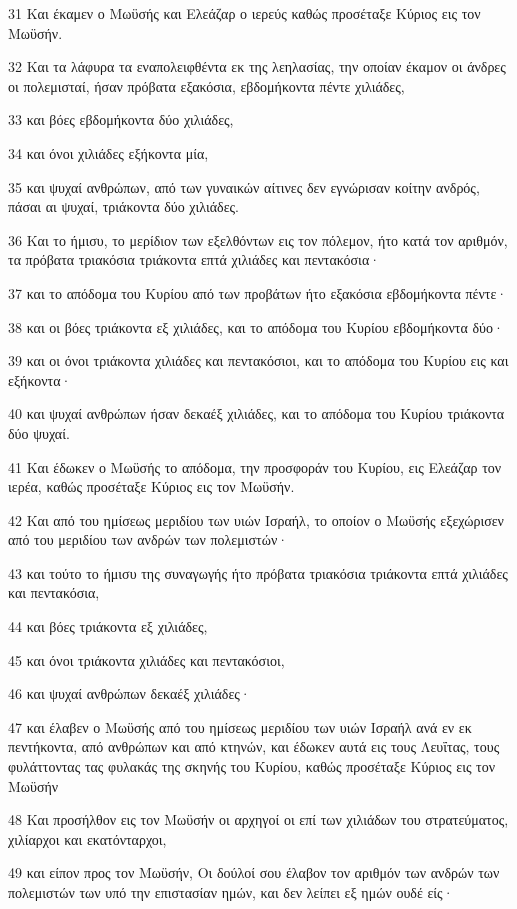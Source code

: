 \par 31 Και έκαμεν ο Μωϋσής και Ελεάζαρ ο ιερεύς καθώς προσέταξε Κύριος εις τον Μωϋσήν.
\par 32 Και τα λάφυρα τα εναπολειφθέντα εκ της λεηλασίας, την οποίαν έκαμον οι άνδρες οι πολεμισταί, ήσαν πρόβατα εξακόσια, εβδομήκοντα πέντε χιλιάδες,
\par 33 και βόες εβδομήκοντα δύο χιλιάδες,
\par 34 και όνοι χιλιάδες εξήκοντα μία,
\par 35 και ψυχαί ανθρώπων, από των γυναικών αίτινες δεν εγνώρισαν κοίτην ανδρός, πάσαι αι ψυχαί, τριάκοντα δύο χιλιάδες.
\par 36 Και το ήμισυ, το μερίδιον των εξελθόντων εις τον πόλεμον, ήτο κατά τον αριθμόν, τα πρόβατα τριακόσια τριάκοντα επτά χιλιάδες και πεντακόσια·
\par 37 και το απόδομα του Κυρίου από των προβάτων ήτο εξακόσια εβδομήκοντα πέντε·
\par 38 και οι βόες τριάκοντα εξ χιλιάδες, και το απόδομα του Κυρίου εβδομήκοντα δύο·
\par 39 και οι όνοι τριάκοντα χιλιάδες και πεντακόσιοι, και το απόδομα του Κυρίου εις και εξήκοντα·
\par 40 και ψυχαί ανθρώπων ήσαν δεκαέξ χιλιάδες, και το απόδομα του Κυρίου τριάκοντα δύο ψυχαί.
\par 41 Και έδωκεν ο Μωϋσής το απόδομα, την προσφοράν του Κυρίου, εις Ελεάζαρ τον ιερέα, καθώς προσέταξε Κύριος εις τον Μωϋσήν.
\par 42 Και από του ημίσεως μεριδίου των υιών Ισραήλ, το οποίον ο Μωϋσής εξεχώρισεν από του μεριδίου των ανδρών των πολεμιστών·
\par 43 και τούτο το ήμισυ της συναγωγής ήτο πρόβατα τριακόσια τριάκοντα επτά χιλιάδες και πεντακόσια,
\par 44 και βόες τριάκοντα εξ χιλιάδες,
\par 45 και όνοι τριάκοντα χιλιάδες και πεντακόσιοι,
\par 46 και ψυχαί ανθρώπων δεκαέξ χιλιάδες·
\par 47 και έλαβεν ο Μωϋσής από του ημίσεως μεριδίου των υιών Ισραήλ ανά εν εκ πεντήκοντα, από ανθρώπων και από κτηνών, και έδωκεν αυτά εις τους Λευΐτας, τους φυλάττοντας τας φυλακάς της σκηνής του Κυρίου, καθώς προσέταξε Κύριος εις τον Μωϋσήν
\par 48 Και προσήλθον εις τον Μωϋσήν οι αρχηγοί οι επί των χιλιάδων του στρατεύματος, χιλίαρχοι και εκατόνταρχοι,
\par 49 και είπον προς τον Μωϋσήν, Οι δούλοί σου έλαβον τον αριθμόν των ανδρών των πολεμιστών των υπό την επιστασίαν ημών, και δεν λείπει εξ ημών ουδέ είς·
